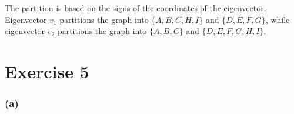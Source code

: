 \documentclass{article}
\begin{document}
The partition is based on the signs of the coordinates of the eigenvector.
Eigenvector \(v_1\) partitions the graph into
\(\{A, B, C, H, I\}\) and \(\{D, E, F, G\}\),
while eigenvector \(v_2\) partitions the graph into
\(\{A, B, C\}\) and \(\{D, E, F, G, H, I\}\).


\section*{Exercise 5}

\subsubsection*{(a)}



\end{document}
